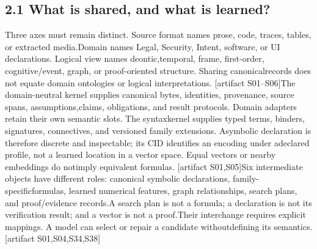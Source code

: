 \subsection*{2.1  What is shared, and what is learned?}
\noindent
Three axes must remain distinct. Source format names prose, code, traces, tables, or extracted media.\linebreak[4]
Domain names Legal, Security, Intent, software, or UI declarations. Logical view names deontic,\linebreak[4]
temporal, frame, first-order, cognitive/event, graph, or proof-oriented structure. Sharing canonical\linebreak[4]
records does not equate domain ontologies or logical interpretations. [artifact S01--S06]\linebreak[4]
The domain-neutral kernel supplies canonical bytes, identities, provenance, source spans, assumptions,\linebreak[4]
claims, obligations, and result protocols. Domain adapters retain their own semantic slots. The syntax\linebreak[4]
kernel supplies typed terms, binders, signatures, connectives, and versioned family extensions. A\linebreak[4]
symbolic declaration is therefore discrete and inspectable; its CID identifies an encoding under a\linebreak[4]
declared profile, not a learned location in a vector space. Equal vectors or nearby embeddings do not\linebreak[4]
imply equivalent formulas. [artifact S01,S05]\linebreak[4]
Six intermediate objects have different roles: canonical symbolic declarations, family-specific\linebreak[4]
formulas, learned numerical features, graph relationships, search plans, and proof/evidence records.\linebreak[4]
A search plan is not a formula; a declaration is not its verification result; and a vector is not a proof.\linebreak[4]
Their interchange requires explicit mappings. A model can select or repair a candidate without\linebreak[4]
defining its semantics. [artifact S01,S04,S34,S38]\par

